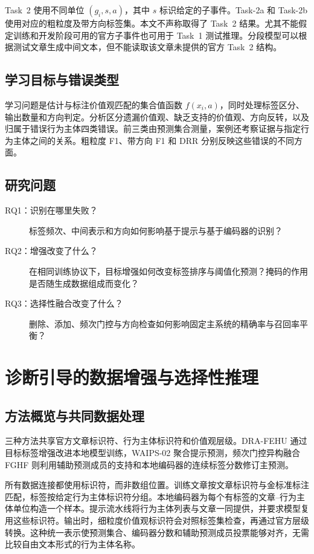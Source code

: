 \documentclass[12pt,a4paper]{article}
\begin{document}
Task~2 使用不同单位 $(g_i,s,a)$，其中 $s$ 标识给定的子事件。Task-2a 和 Task-2b 使用对应的粗粒度及带方向标签集。本文不声称取得了 Task~2 结果。尤其不能假定训练和开发阶段可用的官方子事件也可用于 Task~1 测试推理。分段模型可以根据测试文章生成中间文本，但不能读取该文章未提供的官方 Task~2 结构。

\subsection{学习目标与错误类型}
学习问题是估计与标注价值观匹配的集合值函数 $f(x_i,a)$，同时处理标签区分、输出数量和方向判定。分析区分遗漏价值观、缺乏支持的价值观、方向反转，以及归属于错误行为主体四类错误。前三类由预测集合测量，案例还考察证据与指定行为主体之间的关系。粗粒度 F1、带方向 F1 和 DRR 分别反映这些错误的不同方面。

\subsection{研究问题}
\begin{description}
\item[RQ1：识别在哪里失败？] 标签频次、中间表示和方向如何影响基于提示与基于编码器的识别？
\item[RQ2：增强改变了什么？] 在相同训练协议下，目标增强如何改变标签排序与阈值化预测？掩码的作用是否随生成数据组成而变化？
\item[RQ3：选择性融合改变了什么？] 删除、添加、频次门控与方向检查如何影响固定主系统的精确率与召回率平衡？
\end{description}

\sectionbreak

\section{诊断引导的数据增强与选择性推理}\label{sec:methods}
\subsection{方法概览与共同数据处理}
三种方法共享官方文章标识符、行为主体标识符和价值观层级。DRA-FEHU 通过目标标签增强改进本地模型训练，WAIPS-02 聚合提示预测，频次门控异构融合 FGHF 则利用辅助预测成员的支持和本地编码器的连续标签分数修订主预测。

所有数据连接都使用标识符，而非数组位置。训练文章按文章标识符与金标准标注匹配，标签按给定行为主体标识符分组。本地编码器为每个有标签的文章--行为主体单位构造一个样本。提示流水线将行为主体列表与文章一同提供，并要求模型复用这些标识符。输出时，细粒度价值观标识符会对照标签集检查，再通过官方层级转换。这种统一表示使预测集合、编码器分数和辅助预测成员投票能够对齐，无需比较自由文本形式的行为主体名称。
\end{document}
